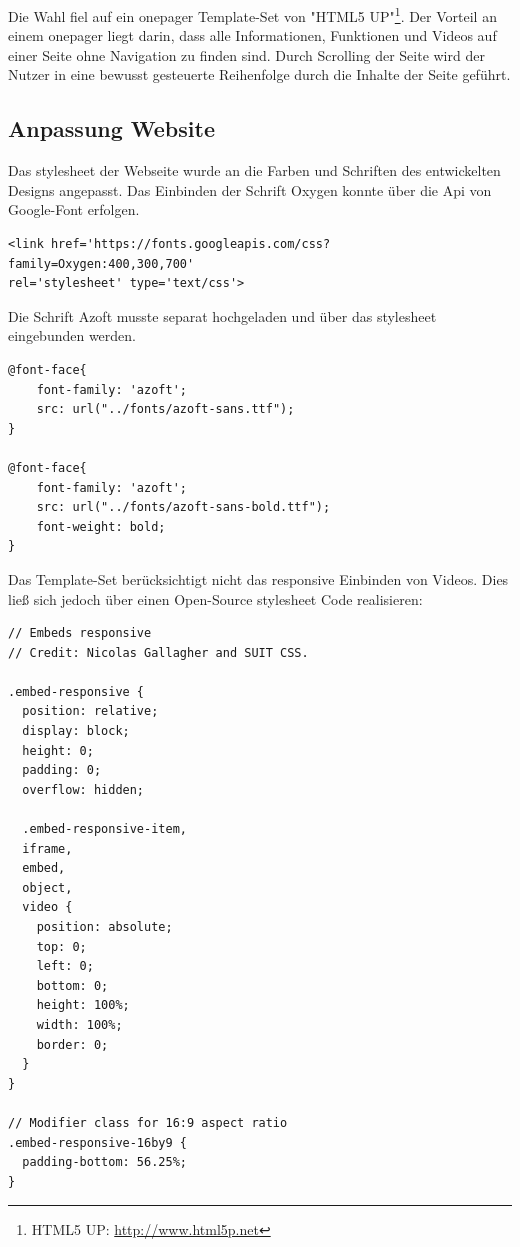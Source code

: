 Die Wahl fiel auf ein \gls{onepager} Template-Set von "HTML5 UP"\footnote{HTML5 UP: \url{http://www.html5p.net}}. Der Vorteil an einem \gls{onepager}  liegt darin, dass alle Informationen, Funktionen und Videos auf einer Seite ohne Navigation zu finden sind. Durch Scrolling der Seite wird der Nutzer in eine bewusst gesteuerte Reihenfolge durch die Inhalte der Seite geführt.


\subsection{Anpassung Website}
Das \Gls{stylesheet} der Webseite wurde an die Farben und Schriften des entwickelten Designs angepasst. Das Einbinden der Schrift Oxygen konnte über die Api von Google-Font erfolgen.

\begin{lstlisting}
<link href='https://fonts.googleapis.com/css?family=Oxygen:400,300,700'
rel='stylesheet' type='text/css'>
\end{lstlisting}

\vspace{0.5cm}

Die Schrift Azoft musste separat hochgeladen und über das \Gls{stylesheet} eingebunden werden.

\begin{lstlisting}
@font-face{
	font-family: 'azoft';
	src: url("../fonts/azoft-sans.ttf");
}

@font-face{
	font-family: 'azoft';
	src: url("../fonts/azoft-sans-bold.ttf");
	font-weight: bold;
}
\end{lstlisting}


Das Template-Set berücksichtigt nicht das responsive Einbinden von Videos. Dies ließ sich jedoch über einen Open-Source \Gls{stylesheet} Code realisieren:

\begin{lstlisting}
// Embeds responsive
// Credit: Nicolas Gallagher and SUIT CSS.

.embed-responsive {
  position: relative;
  display: block;
  height: 0;
  padding: 0;
  overflow: hidden;

  .embed-responsive-item,
  iframe,
  embed,
  object,
  video {
    position: absolute;
    top: 0;
    left: 0;
    bottom: 0;
    height: 100%;
    width: 100%;
    border: 0;
  }
}

// Modifier class for 16:9 aspect ratio
.embed-responsive-16by9 {
  padding-bottom: 56.25%;
}
\end{lstlisting}


